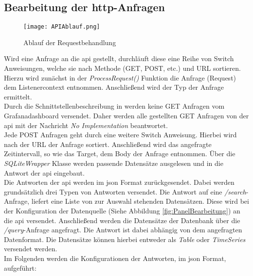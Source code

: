 \subsection{Bearbeitung der \ac{http}-Anfragen}
\begin{wrapfigure}{r}{0.55\textwidth}
    \vspace{-1.2cm}
    \begin{center}
      \texttt{[image: APIAblauf.png]}
    \end{center}
    \vspace{-0.5cm}
    \caption{Ablauf der Requestbehandlung}
    \label{fig:APIAblauf}
    \vspace{-0.5cm}
  \end{wrapfigure}
Wird eine Anfrage an die \ac{api} gestellt, durchläuft diese eine Reihe von Switch Anweisungen, welche sie nach Methode (GET, POST, etc.) und URL sortieren. Hierzu wird zunächst in der \textit{ProcessRequest()} Funktion die Anfrage (Request) dem Listenercontext entnommen. Anschließend wird der Typ der Anfrage ermittelt.\\
Durch die Schnittstellenbeschreibung in \cite{SimpleJSON} werden keine GET Anfragen vom Grafanadashboard versendet. Daher werden alle gestellten GET Anfragen von der \ac{api} mit der Nachricht \glqq\textit{No Implementation}\grqq{} beantwortet.\\
Jede POST Anfragen geht durch eine weitere Switch Anweisung. Hierbei wird nach der URL der Anfrage sortiert. Anschließend wird das angefragte Zeitintervall, so wie das Target, dem Body der Anfrage entnommen. Über die \textit{SQLiteWrapper} Klasse werden passende Datensätze ausgelesen und in die Antwort der \ac{api} eingebaut.\\   
Die Antworten der \ac{api} werden im \ac{json} Format zurückgesendet. Dabei werden grundsätzlich drei Typen von Antworten versendet. Die Antwort auf eine \textit{/search}-Anfrage, liefert eine Liste von zur Auswahl stehenden Datensätzen. Diese wird bei der Konfiguration der Datenquelle (Siehe Abbildung \ref{fig:PanelBearbeitung}) an die \ac{api} versendet. Anschließend werden die Datensätze der Datenbank über die \textit{/query}-Anfrage angefragt. Die Antwort ist dabei abhängig von dem angefragten Datenformat. Die Datensätze können hierbei entweder als \textit{Table} oder \textit{TimeSeries} versendet werden.\\
Im Folgenden werden die Konfigurationen der Antworten, im \ac{json} Format, aufgeführt:

